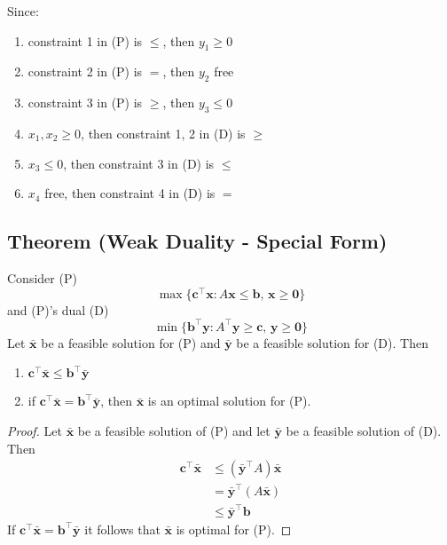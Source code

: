 Since:
\begin{enumerate}
    \item constraint 1 in (P) is $\le$, then $y_1 \ge 0$
    \item constraint 2 in (P) is $=$, then $y_2$ free
    \item constraint 3 in (P) is $\ge$, then $y_3 \le 0$
    \item $x_1,x_2\ge 0$, then constraint 1, 2 in (D) is $\ge$
    \item $x_3\le 0$, then constraint 3 in (D) is $\le$
    \item $x_4$ free, then constraint 4 in (D) is $=$
\end{enumerate}


\begin{thmbox}
    \subsection{Theorem (Weak Duality - Special Form)}
    Consider (P)
    \[ \max \{\bm{c}^{\top} \bm{x}: A \bm{x} \leq \bm{b},\, \bm{x} \geq \bm{0}\} \]
    and (P)'s dual (D)
    \[ \min \{\bm{b}^{\top} \bm{y}: A^{\top} \bm{y} \geq \bm{c},\, \bm{y} \geq \bm{0}\}\]
    Let $ \bm{\bar{x}} $ be a feasible solution for (P) and $ \bm{\bar{y}} $
    be a feasible solution for (D). Then
    \begin{enumerate}[(1)]
        \item $ \bm{c}^\top \bm{\bar{x}}\le \bm{b}^\top \bm{\bar{y}} $
        \item if $ \bm{c}^\top \bm{\bar{x}}=\bm{b}^\top \bm{\bar{y}} $, then
        $ \bm{\bar{x}} $ is an optimal solution for (P).
    \end{enumerate}
\end{thmbox}
\begin{proof}
    Let $ \bm{\bar{x}} $ be a feasible solution of (P) and let $ \bm{\bar{y}} $
    be a feasible solution of (D). Then
    \begin{align*}
        \bm{c}^\top \bm{\bar{x}}
        &\le (\bm{\bar{y}}^\top A)\bm{\bar{x}}\\
        &= \bm{\bar{y}}^\top (A\bm{\bar{x}})\\
        &\le \bm{\bar{y}}^\top \bm{b}
    \end{align*}
    If $ \bm{c}^\top \bm{\bar{x}}=\bm{b}^\top \bm{\bar{y}} $ it follows
    that $ \bm{\bar{x}} $ is optimal for (P).
\end{proof}

